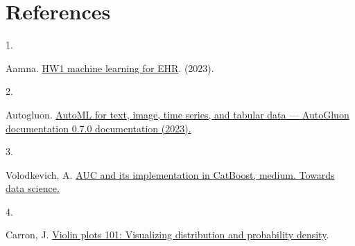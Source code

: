 \documentclass[
]{article}
\newlength{\cslhangindent}
\newlength{\csllabelwidth}
\newlength{\cslentryspacingunit} %
\newenvironment{CSLReferences}[2] %
 {%
  \setlength{\parindent}{0pt}
  \ifodd #1
  \let\oldpar\par
  \def\par{\hangindent=\cslhangindent\oldpar}
  \fi
  \setlength{\parskip}{#2\cslentryspacingunit}
 }%
 {}
\newcommand{\CSLLeftMargin}[1]{\parbox[t]{\csllabelwidth}{#1}}
\newcommand{\CSLRightInline}[1]{\parbox[t]{\linewidth - \csllabelwidth}{#1}\break}
\begin{document}
\newpage

\hypertarget{references}{%
\section*{References}\label{references}}

\hypertarget{refs}{}
\begin{CSLReferences}{0}{0}
\leavevmode{}%
\CSLLeftMargin{1. }%
\CSLRightInline{Aamna.
\href{https://kaggle.com/competitions/hw1-machine-learning-for-ehr}{HW1
machine learning for EHR}. (2023).}

\leavevmode{}%
\CSLLeftMargin{2. }%
\CSLRightInline{Autogluon.
\href{https://auto.gluon.ai/stable/index.html\%20(Accessed:\%2013\%20March\%202023).}{AutoML
for text, image, time series, and tabular data --- AutoGluon
documentation 0.7.0 documentation (2023).}}

\leavevmode{}%
\CSLLeftMargin{3. }%
\CSLRightInline{Volodkevich, A.
\href{\%20https://towardsdatascience.com/auc-and-its-implementation-in-catboost-6bc740c01f98\%20(Accessed:\%20March\%2013,\%202023)}{AUC
and its implementation in CatBoost, medium. Towards data science.}}

\leavevmode{}%
\CSLLeftMargin{4. }%
\CSLRightInline{Carron, J.
\href{https://mode.com/blog/violin-plot-examples/\%20(Accessed:\%20March\%2013,\%202023)}{Violin
plots 101: Visualizing distribution and probability density}.}

\end{CSLReferences}
\end{document}
